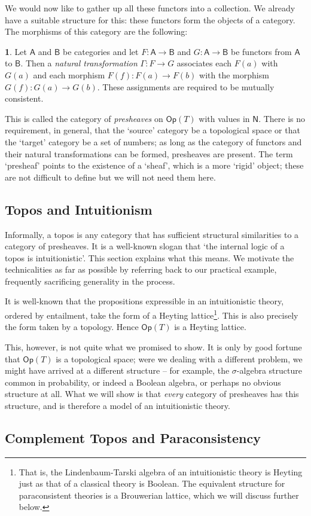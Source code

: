 \documentclass[oneside,english]{article}
\theoremstyle{plain}
\theoremstyle{definition}
\newtheorem{defn}[thm]{\protect\definitionname}
\theoremstyle{definition}
\providecommand{\definitionname}{Definition}
\begin{document}
We would now like to gather up all these functors into a collection. We already have a suitable structure for this: these functors form the objects of a category. The morphisms of this category are the following:
\begin{defn}
	Let $\boldsymbol{\mathsf{A}}$ and $\boldsymbol{\mathsf{B}}$ be categories and let $F:\boldsymbol{\mathsf{A}}\to \boldsymbol{\mathsf{B}}$ and $G:\boldsymbol{\mathsf{A}}\to \boldsymbol{\mathsf{B}}$ be functors from $\boldsymbol{\mathsf{A}}$ to $\boldsymbol{\mathsf{B}}$. Then a \emph{natural transformation} $\Gamma: F\to G$ associates each $F(a)$ with $G(a)$ and each morphism $F(f):F(a)\to F(b)$ with the morphism $G(f):G(a)\to G(b)$. These assignments are required to be mutually consistent.
\end{defn}
This is called the category of \emph{presheaves} on $\boldsymbol{\mathsf{Op}}(T)$ with values in $\boldsymbol{\mathsf{N}}$. There is no requirement, in general, that the `source' category be a topological space or that the `target' category be a set of numbers; as long as the category of functors and their natural transformations can be formed, presheaves are present. The term `presheaf' points to the existence of a `sheaf', which is a more `rigid' object; these are not difficult to define but we will not need them here. 

\subsection{Topos and Intuitionism}

Informally, a topos is any category that has sufficient structural similarities to a category of presheaves. It is a well-known slogan that `the internal logic of a topos is intuitionistic'. This section explains what this means. We motivate the technicalities as far as possible by referring back to our practical example, frequently sacrificing generality in the process. 

It is well-known that the propositions expressible in an intuitionistic theory, ordered by entailment, take the form of a Heyting lattice\footnote{That is, the Lindenbaum-Tarski algebra of an intuitionistic theory is Heyting just as that of a classical theory is Boolean. The equivalent structure for paraconsistent theories is a Brouwerian lattice, which we will discuss further below.}. This is also precisely the form taken by a topology. Hence $\boldsymbol{\mathsf{Op}}(T)$ is a Heyting lattice.

This, however, is not quite what we promised to show. It is only by good fortune that $\boldsymbol{\mathsf{Op}}(T)$ is a topological space; were we dealing with a different problem, we might have arrived at a different structure -- for example, the $\sigma$-algebra structure common in probability, or indeed a Boolean algebra, or perhaps no obvious structure at all. What we will show is that \emph{every} category of presheaves has this structure, and is therefore a model of an intuitionistic theory.

\subsection{Complement Topos and Paraconsistency}
\end{document}
